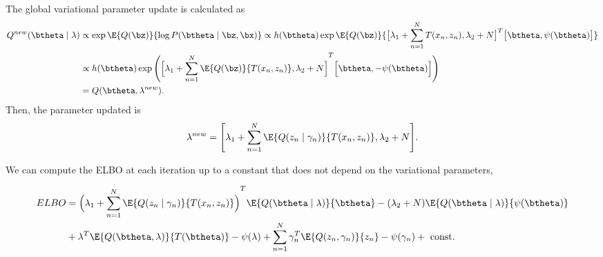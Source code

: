 The global variational parameter update is calculated as
\[
  \begin{aligned}
    Q^{new}(\btheta \mid \lambda) &\propto \exp \E{Q(\bz)}{\log P(\btheta \mid \bz , \bx)} \propto h(\btheta) \exp \E{Q(\bz)}{\big[  \lambda_{1} + \sum_{n=1}^{N}T(x_{n}, z_{n}), \lambda_{2} + N \big]^{T}\big[ \btheta, \psi(\btheta) \big]}\\
    &\propto h(\btheta) \exp \Bigg( {\Big[  \lambda_{1} + \sum_{n=1}^{N}\E{Q(\bz)}{T(x_{n}, z_{n})}, \lambda_{2} + N \Big]}^{T}\Big[ \btheta, - \psi(\btheta) \Big]\Bigg)\\
    &= Q(\btheta, \lambda^{new}).
  \end{aligned}
\]
Then, the parameter updated is
\[
  \lambda^{new} = \Bigg[ \lambda_{1} + \sum_{n=1}^{N} \E{Q(z_{n}\mid \gamma_{n})}{T(x_{n},z_{n})}, \lambda_{2} + N \Bigg].
\]

We can compute the ELBO at each iteration up to a constant that does not depend on the variational parameters,

\[
  \begin{aligned}
    ELBO &= {\Big( \lambda_{1} + \sum_{n=1}^{N} \E{Q(z_{n}\mid \gamma_{n})}{T(x_{n},z_{n})}\Big)}^{T}\E{Q(\btheta \mid \lambda)}{\btheta} - (\lambda_{2} + N) \E{Q(\btheta \mid \lambda)}{\psi(\btheta)}\\
    &+ \lambda ^{T} \E{Q(\btheta, \lambda)}{T(\btheta)} - \psi(\lambda) + \sum_{n=1}^{N}\gamma_{n}^{T}\E{Q(z_{n}, \gamma_{n})}{z_{n}} - \psi(\gamma_{n}) + \text{ const. }
  \end{aligned}
\]



